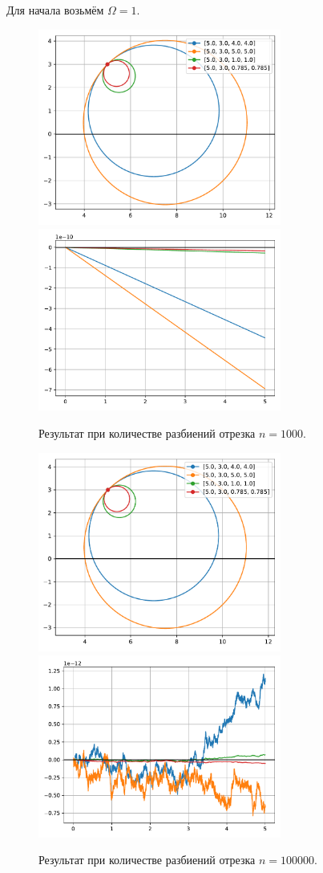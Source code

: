         Для начала возьмём \( \Omega = 1 \).
        \begin{figure}[H]
            \centering
            \includegraphics[width=8cm]{pictures/n1e3plot.pdf}
            \includegraphics[width=8cm]{pictures/n1e3conv.pdf}
            \caption{Результат при количестве разбиений отрезка \( n = 1000 \).}
        \end{figure}

        \begin{figure}[H]
            \centering
            \includegraphics[width=8cm]{pictures/n1e5plot.pdf}
            \includegraphics[width=8cm]{pictures/n1e5conv.pdf}
            \caption{Результат при количестве разбиений отрезка \( n = 100000 \).}
        \end{figure}


